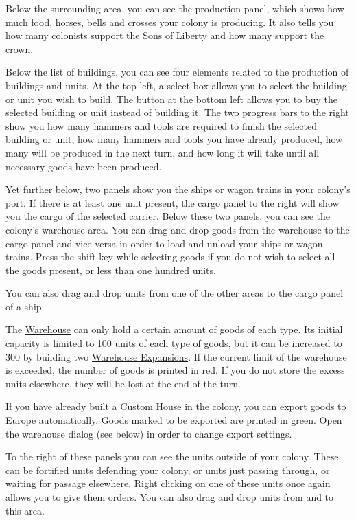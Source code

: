\documentclass[12pt]{book}
\begin{document}
Below the surrounding area, you can see the production panel, which
shows how much food, horses, bells and crosses your colony is
producing. It also tells you how many colonists support the Sons of
Liberty and how many support the crown.

Below the list of buildings, you can see four elements related to
the production of buildings and units. At the top left, a select box
allows you to select the building or unit you wish to build. The
button at the bottom left allows you to buy the selected building or
unit instead of building it. The two progress bars to the right show
you how many hammers and tools are required to finish the selected
building or unit, how many hammers and tools you have already
produced, how many will be produced in the next turn, and how long it
will take until all necessary goods have been produced.

Yet further below, two panels show you the ships or wagon trains in
your colony's port. If there is at least one unit present, the cargo
panel to the right will show you the cargo of the selected
carrier. Below these two panels, you can see the colony's warehouse
area. You can drag and drop goods from the warehouse to the cargo
panel and vice versa in order to load and unload your ships or wagon
trains. Press the shift key while selecting goods if you do not wish
to select all the goods present, or less than one hundred units.

You can also drag and drop units from one of the other areas
to the cargo panel of a ship.

The \hyperlink{Warehouse}{Warehouse} can only hold a certain amount of
goods of each type. Its initial capacity is limited to 100 units of
each type of goods, but it can be increased to 300 by building two
\hyperlink{Warehouse Expansion}{Warehouse Expansions}. If the current
limit of the warehouse is exceeded, the number of goods is printed in
red. If you do not store the excess units elsewhere, they will be lost
at the end of the turn.

If you have already built a \hyperlink{Custom House}{Custom House} in
the colony, you can export goods to Europe automatically. Goods marked
to be exported are printed in green. Open the warehouse dialog (see
below) in order to change export settings.

To the right of these panels you can see the units outside of your
colony. These can be fortified units defending your colony, or units
just passing through, or waiting for passage elsewhere. Right clicking
on one of these units once again allows you to give them orders. You
can also drag and drop units from and to this area.
\end{document}
